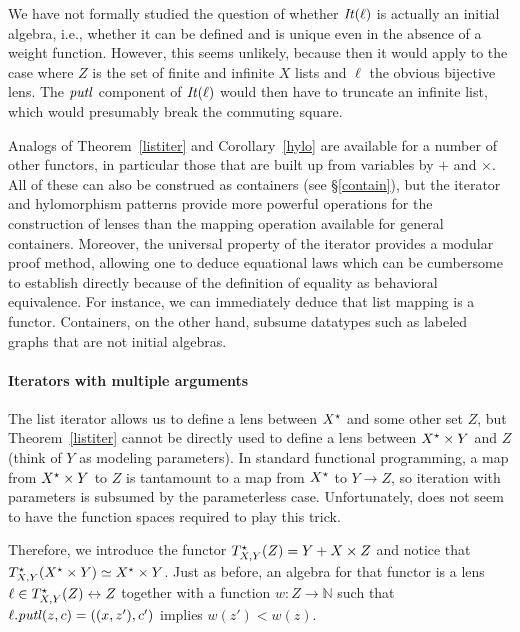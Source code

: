 \begin{defn}[$R$-similarity]
\begin{theorem}
\begin{lemma}
\begin{theorem}[No products]
\begin{lemma}
\begin{defn}
\begin{theorem}
\begin{corollary}[Hylomorphism]
We have not formally studied the question of whether $\mathit{It}(\ell)$
is actually an initial algebra, i.e., whether it can
be defined and is unique even in the absence of a weight function. However,
this seems unlikely, because then it would apply to the case where $Z$ is the
set of finite and infinite $X$ lists and $\ell$ the obvious bijective lens.
The $\mathit{putl}$ component of $\mathit{It}(\ell)$ would then have to truncate an infinite
list, which would presumably break the commuting square.

Analogs of Theorem~\ref{listiter} and
Corollary~\ref{hylo} are available for a number of other functors, in
particular those that are built up from variables by $+$ and $\times$.
All of these can also be construed as containers (see
\S\ref{contain}), but the iterator and hylomorphism patterns
provide more powerful operations for the construction of lenses than
the mapping operation available for general containers. Moreover, the
universal property of the iterator provides a modular proof method,
allowing one to deduce equational laws which can be cumbersome to
establish directly because of the definition of equality as behavioral
equivalence. For instance, we can immediately deduce that list mapping
is a functor. Containers, on the other hand, subsume datatypes such as labeled graphs that are not initial algebras. 

\paragraph{Iterators with multiple arguments}
The list iterator allows us to define a lens between $X^\star$ and some
other set $Z$, but Theorem~\ref{listiter} cannot be directly used to define
a lens between $X^\star \times Y$ and $Z$ (think of $Y$ as modeling
parameters).  In standard functional programming, a
map from $X^\star\times Y$ to $Z$ is tantamount to a map from $X^\star$
to $Y{\rightarrow}Z$, so iteration with parameters is subsumed by
the parameterless case. Unfortunately, \LENS{} does not seem to have the
function spaces required to play this trick.

Therefore, we introduce the functor $T^\star_{X,Y}(Z)=Y + X \times
Z$ and notice that $T^\star_{X,Y}(X^\star \times Y)\simeq X^\star \times
Y$. Just as before, 
an algebra for that functor is a lens $\ell \in T^\star_{X,Y}(Z)\leftrightarrow Z$ together with a function $w:Z\rightarrow \mathbb{N}$ such that 
$\ell.\mathit{putl}(z,c) = ((x,z'),c')$ implies $w(z')<w(z)$.


\end{corollary}
\end{theorem}
\end{defn}
\end{lemma}
\end{theorem}
\end{lemma}
\end{theorem}
\end{defn}
